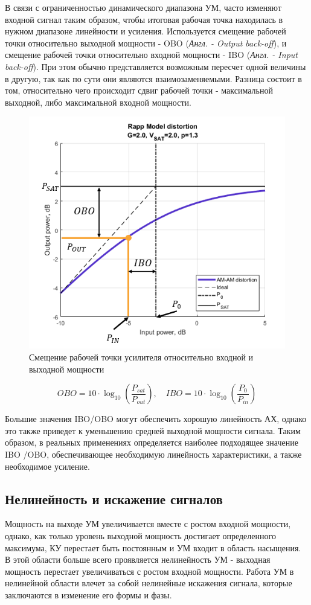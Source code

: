 В связи с ограниченностью динамического диапазона УМ, часто изменяют
входной сигнал таким образом, чтобы итоговая рабочая точка находилась в
нужном диапазоне линейности и усиления. Используется смещение рабочей точки
относительно выходной мощности - OBO (\textit{Англ. - Output back-off}), и
смещение рабочей точки относительно входной мощности - IBO (\textit{Англ. -
Input back-off}). При этом обычно представляется возможным пересчет одной
величины в другую, так как по сути они являются взаимозаменяемыми. Разница
состоит в том, относительно чего происходит сдвиг рабочей точки -
максимальной выходной, либо максимальной входной мощности.

\begin{figure}[h!]
    \centering
    \includegraphics[width=0.7\linewidth]{figs/pa_obo_ibo.png}
    \caption{Смещение рабочей точки усилителя относительно входной и выходной мощности}
    \label{fig:1.2}
\end{figure}

\begin{equation}
    OBO = 10 \cdot \log_{10}\left(\frac{P_{sat}}{P_{out}}\right), \quad
    IBO = 10 \cdot \log_{10}\left(\frac{P_{0}}{P_{in}}\right)
\end{equation}

Большие значения IBO\slash OBO могут обеспечить хорошую линейность АХ,
однако это также приведет к уменьшению средней выходной мощности сигнала.
Таким образом, в реальных применениях определяется наиболее подходящее
значение IBO \slash OBO, обеспечивающее необходимую линейность
характеристики, а также необходимое усиление.


\subsection{Нелинейность и искажение сигналов}
Мощность на выходе УМ увеличивается вместе с ростом входной мощности,
однако, как только уровень выходной мощность достигает определенного
максимума, КУ перестает быть постоянным и УМ входит в область насыщения. В
этой области больше всего проявляется нелинейность УМ - выходная мощность
перестает увеличиваться с ростом входной мощности. Работа УМ в нелинейной
области влечет за собой нелинейные искажения сигнала, которые заключаются в
изменение его формы и фазы.

